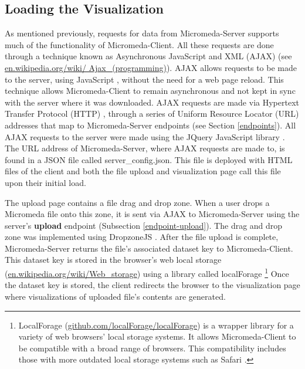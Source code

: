 \subsection{Loading the Visualization}

As mentioned previously, requests for data from Micromeda-Server supports much of the functionality of Micromeda-Client. All these requests are done through a technique known as Asynchronous JavaScript and XML (AJAX) \cite{garrett2005ajax,li2012jquery} (see \href{en.wikipedia.org/wiki/Ajax\_(programming)}{en.wikipedia.org/wiki/ Ajax\_(programming)}). AJAX allows requests to be made to the server, using JavaScript \cite{flanagan2006javascript}, without the need for a web page reload. This technique allows Micromeda-Client to remain asynchronous and not kept in sync with the server where it was downloaded. AJAX requests are made via Hypertext Transfer Protocol (HTTP) \cite{fielding1999hypertext}, through a series of Uniform Resource Locator (URL) addresses \cite{berners1994rfc} that map to Micromeda-Server endpoints (see Section \ref{endpoints}). All AJAX requests to the server were made using the JQuery JavaScript library \cite{chaffer2013learning,li2012jquery}. The URL address of Micromeda-Server, where AJAX requests are made to, is found in a JSON file called server\_config.json. This file is deployed with HTML files of the client and both the file upload and visualization page call this file upon their initial load.

The upload page contains a file drag and drop zone. When a user drops a Micromeda file onto this zone, it is sent via AJAX to Micromeda-Server using the server's \textbf{upload} endpoint (Subsection \ref{endpoint-upload}). The drag and drop zone was implemented using DropzoneJS \cite{meno}. After the file upload is complete, Micromeda-Server returns the file's associated dataset key to Micromeda-Client. This dataset key is stored in the browser's web local storage \cite{Hickson} (\href{en.wikipedia.org/wiki/Web\_storage}{en.wikipedia.org/wiki/Web\_storage}) using a library called localForage \cite{localforage} \footnote{LocalForage (\href{github.com/localForage/localForage}{github.com/localForage/localForage}) is a wrapper library for a variety of web browsers' local storage systems. It allows Micromeda-Client to be compatible with a broad range of browsers. This compatibility includes those with more outdated local storage systems such as Safari \cite{lawson_2014}.} Once the dataset key is stored, the client redirects the browser to the visualization page where visualizations of uploaded file's contents are generated.

